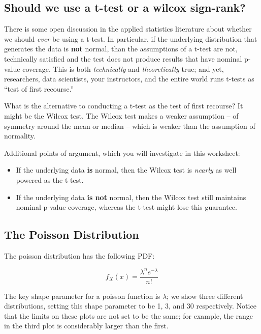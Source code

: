 \documentclass[
]{book}
\providecommand{\tightlist}{%
  \setlength{\itemsep}{0pt}\setlength{\parskip}{0pt}}
\theoremstyle{definition}
\theoremstyle{definition}
\theoremstyle{definition}
\theoremstyle{definition}
\theoremstyle{remark}
\begin{document}
\subsection{Should we use a t-test or a wilcox sign-rank?}\label{should-we-use-a-t-test-or-a-wilcox-sign-rank}

There is some open discussion in the applied statistics literature about whether we should \emph{ever} be using a t-test. In particular, if the underlying distribution that generates the data is \textbf{not} normal, than the assumptions of a t-test are not, technically satisfied and the test does not produce results that have nominal p-value coverage. This is both \emph{technically} and \emph{theoretically} true; and yet, researchers, data scientists, your instructors, and the entire world runs t-tests as ``test of first recourse.''

What is the alternative to conducting a t-test as the test of first recourse? It might be the Wilcox test. The Wilcox test makes a weaker assumption -- of symmetry around the mean or median -- which is weaker than the assumption of normality.

Additional points of argument, which you will investigate in this worksheet:

\begin{itemize}
\tightlist
\item
  If the underlying data \textbf{is} normal, then the Wilcox test is \emph{nearly} as well powered as the t-test.
\item
  If the underlying data \textbf{is not} normal, then the Wilcox test still maintains nominal p-value coverage, whereas the t-test might lose this guarantee.
\end{itemize}

\subsection{The Poisson Distribution}\label{the-poisson-distribution}

The poisson distribution has the following PDF:

\[
f_X(x) = \frac{\lambda^n e^{-\lambda}}{n!}
\]

The key shape parameter for a poisson function is \(\lambda\); we show three different distributions, setting this shape parameter to be 1, 3, and 30 respectively. Notice that the limits on these plots are not set to be the same; for example, the range in the third plot is considerably larger than the first.
\end{document}
